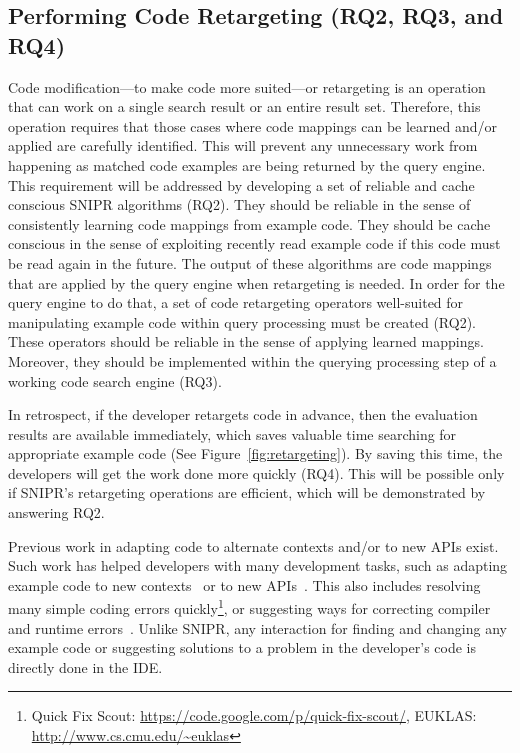 \documentclass[conference]{IEEEtran}
\begin{document}
\subsection{Performing Code Retargeting (RQ2, RQ3, and RQ4)}
\label{sec:restqs}
Code modification---to make code more suited---or retargeting is an operation that can work on a single search result or an entire result set. Therefore, this operation requires that those cases where code mappings can be learned and/or applied are carefully identified. This will prevent any unnecessary work from happening as matched code examples are being returned by the query engine. This requirement will be addressed by developing a set of reliable and cache conscious \uppercase{SnipR} algorithms (RQ2). They should be reliable in the sense of consistently learning code mappings from example code. They should be cache conscious in the sense of exploiting recently read example code if this code must be read again in the future. The output of these algorithms are code mappings that are applied by the query engine when retargeting is needed. In order for the query engine to do that, a set of code retargeting operators well-suited for manipulating example code within query processing must be created (RQ2). These operators should be reliable in the sense of applying learned mappings. Moreover, they should be implemented within the querying processing step of a working code search engine (RQ3). 

In retrospect, if the developer retargets code in advance, then the evaluation results are available immediately, which saves valuable time searching for appropriate example code (See Figure~\ref{fig:retargeting}). By saving this time, the developers will get the work done more quickly (RQ4). This will be possible only if \uppercase{SnipR}'s retargeting operations are efficient, which will be demonstrated by answering RQ2. 

Previous work in adapting code to alternate contexts and/or to new APIs exist. Such work has helped developers with many development tasks, such as adapting example code to new contexts~\cite{Wightman:2012gc} or to new APIs~\cite{Nita:2010en}. This also includes resolving many simple coding errors quickly\footnote{{Quick Fix Scout: \url{https://code.google.com/p/quick-fix-scout/}}, {EUKLAS: \url{http://www.cs.cmu.edu/~euklas}}}, or suggesting ways for correcting compiler and runtime errors~\cite{Hartmann:2010hx}. Unlike \uppercase{SnipR}, any interaction for finding and changing any example code or suggesting solutions to a problem in the developer's code is directly done in the IDE.
\end{document}
